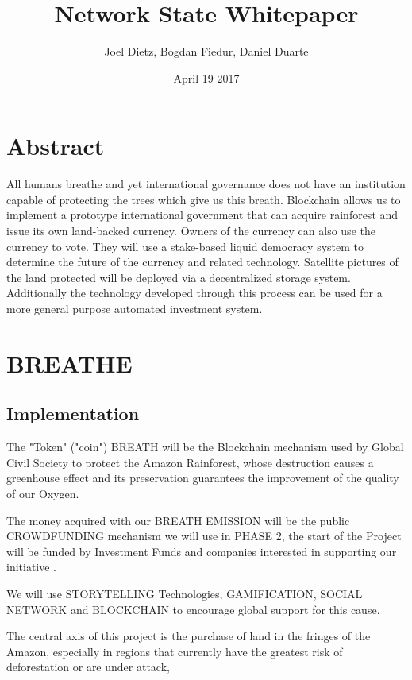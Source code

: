 \documentclass{article}
\title{Network State Whitepaper}
\author{Joel Dietz, Bogdan Fiedur, Daniel Duarte  }
\date{April 19 2017 }
\begin{document}
\setcounter{page}{1}

\maketitle

\section{Abstract}

All humans breathe and yet international governance does not have an institution capable of protecting the trees which give us this breath. Blockchain allows us to implement a prototype international government that can acquire rainforest and issue its own land-backed currency. Owners of the currency can also use the currency to vote. They will use a stake-based liquid democracy system to determine the future of the currency and related technology. Satellite pictures of the land protected will be deployed via a decentralized storage system. Additionally the technology developed through this process can be used for a more general purpose automated investment system.

\section{BREATHE}

\subsection{Implementation }

The "Token" ("coin") BREATH will be the Blockchain mechanism used by Global Civil Society to protect the Amazon Rainforest, whose destruction causes a greenhouse effect and its preservation guarantees the improvement of the quality of our Oxygen.

The money acquired with our BREATH EMISSION will be the public CROWDFUNDING mechanism we will use in PHASE 2, the start of the Project will be funded by Investment Funds and companies interested in supporting our initiative .

We will use STORYTELLING Technologies, GAMIFICATION, SOCIAL NETWORK and BLOCKCHAIN to encourage global support for this cause.

The central axis of this project is the purchase of land in the fringes of the Amazon, especially in regions that currently have the greatest risk of deforestation or are under attack,
\end{document}
